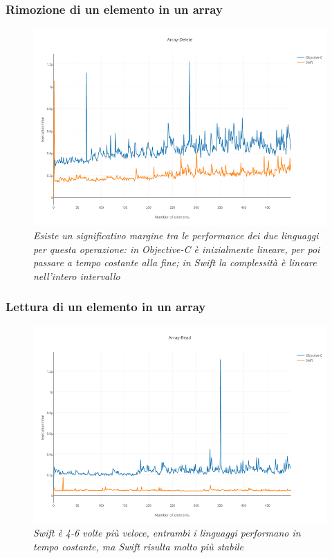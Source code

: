 \subsubsection{Rimozione di un elemento in un array}
\begin{figure}[H]
      \centering
      \includegraphics[scale=0.50]{immagini/array_delete.png}
            \vspace{0.8cm}
            \caption{\textit{Esiste un significativo margine tra le performance dei due linguaggi per questa operazione: in Objective-C è inizialmente lineare, per poi passare a tempo costante alla fine; in Swift la complessità è lineare nell'intero intervallo}}
\end{figure}
\subsubsection{Lettura di un elemento in un array}
\begin{figure}[H]
      \centering
      \includegraphics[scale=0.50]{immagini/array_read.png}
            \vspace{0.8cm}
            \caption{\textit{Swift è 4-6 volte più veloce, entrambi i linguaggi performano in tempo costante, ma Swift risulta molto più stabile}}
\end{figure}
